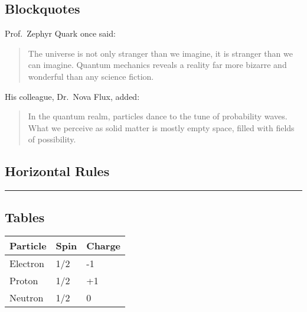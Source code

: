 \begin{Shaded}
\begin{Highlighting}[]
    \OperatorTok{{-}} \OperatorTok{*}\OperatorTok{*}\OperatorTok{/}
\end{Highlighting}
\end{Shaded}

\subsection{Blockquotes}\label{blockquotes}

Prof.~Zephyr Quark once said:

\begin{quote}
The universe is not only stranger than we imagine, it is stranger than
we can imagine. Quantum mechanics reveals a reality far more bizarre and
wonderful than any science fiction.
\end{quote}

His colleague, Dr.~Nova Flux, added:

\begin{quote}
In the quantum realm, particles dance to the tune of probability waves.
What we perceive as solid matter is mostly empty space, filled with
fields of possibility.
\end{quote}

\subsection{Horizontal Rules}\label{horizontal-rules}

\begin{center}\rule{0.5\linewidth}{0.5pt}\end{center}

\subsection{Tables}\label{tables}

\begin{longtable}[]{@{}lll@{}}
\toprule\noalign{}
Particle & Spin & Charge \\
\midrule\noalign{}
\endhead
\bottomrule\noalign{}
\endlastfoot
Electron & 1/2 & -1 \\
Proton & 1/2 & +1 \\
Neutron & 1/2 & 0 \\
\end{longtable}

